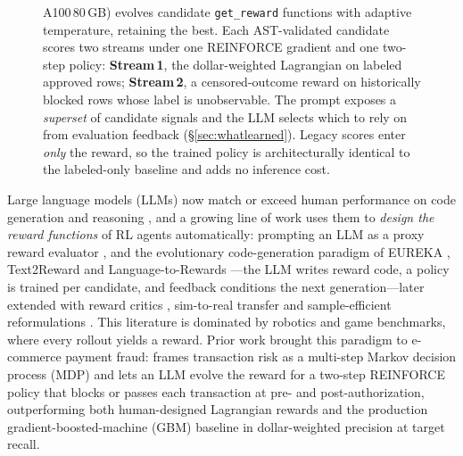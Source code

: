 \documentclass[11pt]{article}
\begin{document}
\begin{figure}[t]
{  A100\,80\,GB) evolves candidate \texttt{get\_reward} functions with adaptive temperature,
  retaining the best. Each AST-validated candidate scores two streams under one REINFORCE
  gradient and one two-step policy: \textbf{Stream\,1}, the dollar-weighted Lagrangian on
  labeled approved rows; \textbf{Stream\,2}, a censored-outcome reward on historically blocked
  rows whose label is unobservable. The prompt exposes a \emph{superset} of candidate signals and
  the LLM selects which to rely on from evaluation feedback (\S\ref{sec:whatlearned}). Legacy
  scores enter \emph{only} the reward, so the trained policy is architecturally identical to the
  labeled-only baseline and adds no inference cost.%
}
\label{fig:LLM-RL-overview}
\end{figure}

Large language models (LLMs) now match or exceed human performance on code generation
\cite{chen2021evaluating} and reasoning \cite{kojima2022large}, and a growing line of work uses
them to \emph{design the reward functions} of RL agents automatically: prompting an LLM as a proxy
reward evaluator \cite{kwon2023reward}, and the evolutionary code-generation paradigm of EUREKA
\cite{ma2023eureka}, Text2Reward \cite{xie2024text2reward} and Language-to-Rewards
\cite{yu2023language}---the LLM writes reward code, a policy is trained per candidate, and feedback
conditions the next generation---later extended with reward critics \cite{li2024automc},
sim-to-real transfer \cite{ma2024dreureka} and sample-efficient reformulations
\cite{sarukkai2024automated,sun2025card}. This literature is dominated by robotics and game
benchmarks, where every rollout yields a reward.
Prior work brought this paradigm to e-commerce payment fraud: \citet{qu2025llmenhanced} frames transaction risk as a multi-step Markov decision process (MDP)
and lets an LLM evolve the reward for a two-step REINFORCE policy that blocks or passes each
transaction at pre- and post-authorization, outperforming both human-designed Lagrangian
rewards and the production gradient-boosted-machine (GBM) baseline in dollar-weighted
precision at target recall.
\end{document}
